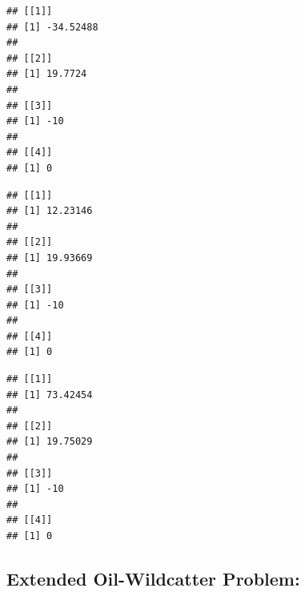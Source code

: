 \documentclass[
]{article}
\newenvironment{Shaded}{\begin{snugshade}}{\end{snugshade}}
\newcommand{\ControlFlowTok}[1]{\textcolor[rgb]{0.13,0.29,0.53}{\textbf{#1}}}
\newcommand{\FunctionTok}[1]{\textcolor[rgb]{0.00,0.00,0.00}{#1}}
\newcommand{\NormalTok}[1]{#1}
\newcommand{\SpecialCharTok}[1]{\textcolor[rgb]{0.00,0.00,0.00}{#1}}
\newcommand{\StringTok}[1]{\textcolor[rgb]{0.31,0.60,0.02}{#1}}
\begin{document}
\begin{Shaded}
\end{Shaded}

\begin{verbatim}
## [[1]]
## [1] -34.52488
## 
## [[2]]
## [1] 19.7724
## 
## [[3]]
## [1] -10
## 
## [[4]]
## [1] 0
\end{verbatim}

\begin{Shaded}
\end{Shaded}

\begin{verbatim}
## [[1]]
## [1] 12.23146
## 
## [[2]]
## [1] 19.93669
## 
## [[3]]
## [1] -10
## 
## [[4]]
## [1] 0
\end{verbatim}

\begin{Shaded}
\end{Shaded}

\begin{verbatim}
## [[1]]
## [1] 73.42454
## 
## [[2]]
## [1] 19.75029
## 
## [[3]]
## [1] -10
## 
## [[4]]
## [1] 0
\end{verbatim}

\hypertarget{extended-oil-wildcatter-problem}{%
\subsection{Extended Oil-Wildcatter Problem:}\label{extended-oil-wildcatter-problem}}
\end{document}
